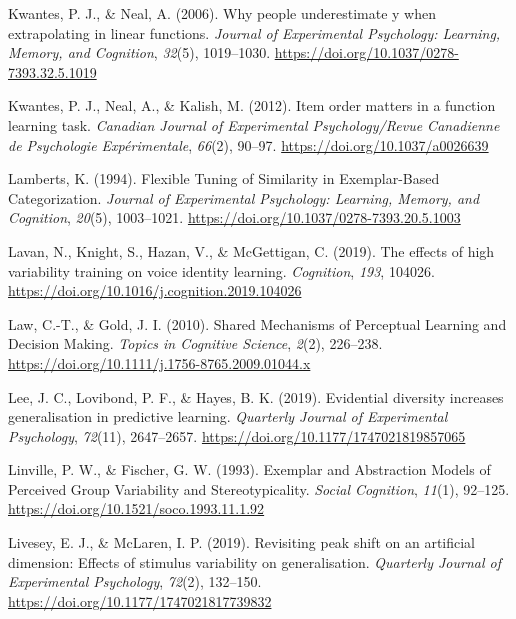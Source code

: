 \documentclass[
  11pt,
  letterpaper,
]{article}
\newlength{\cslhangindent}
\newenvironment{CSLReferences}[2] %
 {\begin{list}{}{%
  \setlength{\itemindent}{0pt}
  \setlength{\leftmargin}{0pt}
  \setlength{\parsep}{0pt}
  \ifodd #1
   \setlength{\leftmargin}{\cslhangindent}
   \setlength{\itemindent}{-1\cslhangindent}
  \fi
  \setlength{\itemsep}{#2\baselineskip}}}
 {\end{list}}
\begin{document}
\begin{CSLReferences}{1}{0}
Kwantes, P. J., \& Neal, A. (2006). Why people underestimate y when
extrapolating in linear functions. \emph{Journal of Experimental
Psychology: Learning, Memory, and Cognition}, \emph{32}(5), 1019--1030.
\url{https://doi.org/10.1037/0278-7393.32.5.1019}

Kwantes, P. J., Neal, A., \& Kalish, M. (2012). Item order matters in a
function learning task. \emph{Canadian Journal of Experimental
Psychology/Revue Canadienne de Psychologie Exp{é}rimentale},
\emph{66}(2), 90--97. \url{https://doi.org/10.1037/a0026639}

Lamberts, K. (1994). Flexible {Tuning} of {Similarity} in
{Exemplar-Based Categorization}. \emph{Journal of Experimental
Psychology: Learning, Memory, and Cognition}, \emph{20}(5), 1003--1021.
\url{https://doi.org/10.1037/0278-7393.20.5.1003}

Lavan, N., Knight, S., Hazan, V., \& McGettigan, C. (2019). The effects
of high variability training on voice identity learning.
\emph{Cognition}, \emph{193}, 104026.
\url{https://doi.org/10.1016/j.cognition.2019.104026}

Law, C.-T., \& Gold, J. I. (2010). Shared {Mechanisms} of {Perceptual
Learning} and {Decision Making}. \emph{Topics in Cognitive Science},
\emph{2}(2), 226--238.
\url{https://doi.org/10.1111/j.1756-8765.2009.01044.x}

Lee, J. C., Lovibond, P. F., \& Hayes, B. K. (2019). Evidential
diversity increases generalisation in predictive learning.
\emph{Quarterly Journal of Experimental Psychology}, \emph{72}(11),
2647--2657. \url{https://doi.org/10.1177/1747021819857065}

Linville, P. W., \& Fischer, G. W. (1993). Exemplar and {Abstraction
Models} of {Perceived Group Variability} and {Stereotypicality}.
\emph{Social Cognition}, \emph{11}(1), 92--125.
\url{https://doi.org/10.1521/soco.1993.11.1.92}

Livesey, E. J., \& McLaren, I. P. (2019). Revisiting peak shift on an
artificial dimension: {Effects} of stimulus variability on
generalisation. \emph{Quarterly Journal of Experimental Psychology},
\emph{72}(2), 132--150. \url{https://doi.org/10.1177/1747021817739832}


\end{CSLReferences}
\end{document}
